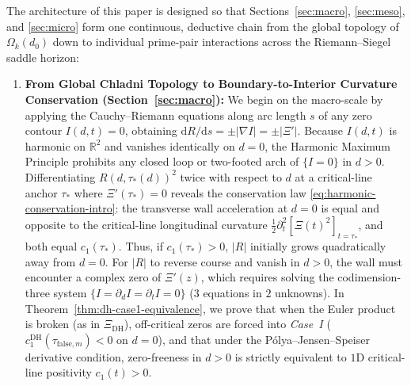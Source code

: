 \documentclass[11pt,reqno]{amsart}
\theoremstyle{definition}
\theoremstyle{remark}
\numberwithin{equation}{section}
\newcommand{\dd}{\mathrm{d}}
\newcommand{\DHf}{\mathrm{DH}}
\begin{document}
The architecture of this paper is designed so that Sections~\ref{sec:macro}, \ref{sec:meso}, and \ref{sec:micro} form one continuous, deductive chain from the global topology of $\Omega_k(d_0)$ down to individual prime-pair interactions across the Riemann--Siegel saddle horizon:
\begin{enumerate}[label=\textbf{Step \arabic*.},leftmargin=4.2em]
\item \textbf{From Global Chladni Topology to Boundary-to-Interior Curvature Conservation (Section~\ref{sec:macro}):} We begin on the macro-scale by applying the Cauchy--Riemann equations along arc length $s$ of any zero contour $I(d,t)=0$, obtaining $\dd R/\dd s = \pm|\nabla I| = \pm|\Xi'|$. Because $I(d,t)$ is harmonic on $\mathbb{R}^2$ and vanishes identically on $d=0$, the Harmonic Maximum Principle prohibits any closed loop or two-footed arch of $\{I=0\}$ in $d>0$. Differentiating $R(d,\tau_*(d))^2$ twice with respect to $d$ at a critical-line anchor $\tau_*$ where $\Xi'(\tau_*)=0$ reveals the conservation law \eqref{eq:harmonic-conservation-intro}: the transverse wall acceleration at $d=0$ is equal and opposite to the critical-line longitudinal curvature $\frac{1}{2}\partial_t^2[\Xi(t)^2]_{t=\tau_*}$, and both equal $c_1(\tau_*)$. Thus, if $c_1(\tau_*)>0$, $|R|$ initially grows quadratically away from $d=0$. For $|R|$ to reverse course and vanish in $d>0$, the wall must encounter a complex zero of $\Xi'(z)$, which requires solving the codimension-three system $\{I=\partial_d I=\partial_t I=0\}$ ($3$ equations in $2$ unknowns). In Theorem~\ref{thm:dh-case1-equivalence}, we prove that when the Euler product is broken (as in $\Xi_{\DHf}$), off-critical zeros are forced into \emph{Case~I} ($c_1^{\DHf}(\tau_{\mathrm{false},m}) < 0$ on $d=0$), and that under the P\'{o}lya--Jensen--Speiser derivative condition, zero-freeness in $d>0$ is strictly equivalent to $1$D critical-line positivity $c_1(t)>0$.

\end{enumerate}
\end{document}
